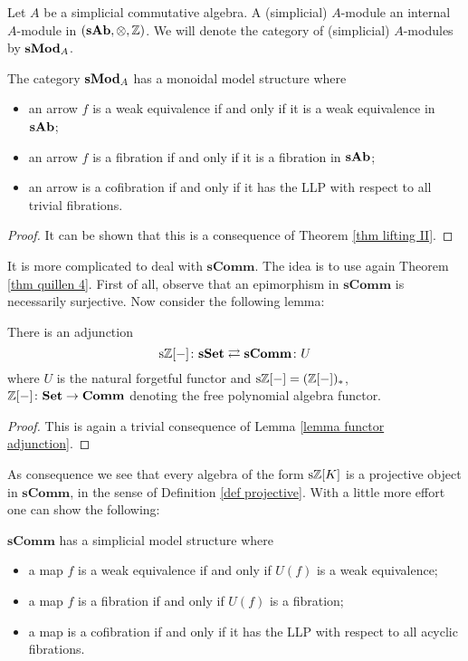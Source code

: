 \begin{refsection}
\begin{defin}
Let $A$ be a simplicial commutative algebra. A (simplicial) $A$-module an internal $A$-module in $(\mathbf s \mathbf{Ab}, \otimes, \mathbb{Z})$. We will denote the category of (simplicial) $A$-modules by $\mathbf s \mathbf{Mod}_A$.
\end{defin}

\begin{cor}
The category $\mathbf s \mathbf{Mod}_A$ has a monoidal model structure where
\begin{itemize}
\item an arrow $f$ is a weak equivalence if and only if it is a weak equivalence in $\mathbf s \mathbf{Ab}$;
\item an arrow $f$ is a fibration if and only if it is a fibration in $\mathbf s \mathbf{Ab}$;
\item an arrow is a cofibration if and only if it has the LLP with respect to all trivial fibrations.
\end{itemize}
\end{cor}

\begin{proof}
It can be shown that this is a consequence of Theorem \ref{thm lifting II}.
\end{proof}

It is more complicated to deal with $\mathbf{sComm}$. The idea is to use again Theorem \ref{thm quillen 4}. First of all, observe that an epimorphism in $\mathbf{sComm}$ is necessarily surjective. Now consider the following lemma:

\begin{lemma} \label{lemma free simplicial algebra}
There is an adjunction
\[
\mathrm s \mathbb{Z}[-] \colon \mathbf{sSet} \rightleftarrows \mathbf{sComm} \colon U
\]
where $U$ is the natural forgetful functor and $\mathrm s \mathbb{Z}[-] = (\mathbb{Z}[-])_*$, $\mathbb{Z}[-] \colon \mathbf{Set} \to \mathbf{Comm}$ denoting the free polynomial algebra functor.
\end{lemma}

\begin{proof}
This is again a trivial consequence of Lemma \ref{lemma functor adjunction}.
\end{proof}

As consequence we see that every algebra of the form $\mathrm s \mathbb{Z}[K]$ is a projective object in $\mathbf{sComm}$, in the sense of Definition \ref{def projective}. With a little more effort one can show the following:

\begin{thm}
$\mathbf{sComm}$ has a simplicial model structure where
\begin{itemize}
\item a map $f$ is a weak equivalence if and only if $U(f)$ is a weak equivalence;
\item a map $f$ is a fibration if and only if $U(f)$ is a fibration;
\item a map is a cofibration if and only if it has the LLP with respect to all acyclic fibrations.
\end{itemize}
\end{thm}


\end{refsection}
